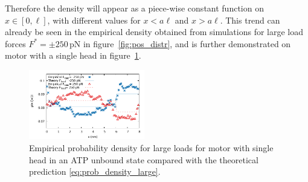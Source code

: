 \documentclass[aps,pre,twocolumn,showpacs,showkeys,superscriptaddress,floatfix]{revtex4-1}
\begin{document}
Therefore the density will appear as a piece-wise constant function on $x \in [0,\ell]$, with different values for $x < a \ell$ and $x > a \ell$. 
This trend can already be seen in the empirical density obtained from simulations for large load forces $F^* = \pm 250 \, \mathrm{pN}$ in figure~\ref{fig:pos_distr},
and is further demonstrated on motor with a single head in figure~\ref{fig:prob_density_large}. 
\begin{figure}[t]
\centering
\includegraphics[width=0.45\textwidth,height=!]{pos_compare.pdf}
\caption{\label{fig:prob_density_large}
Empirical probability density for large loads for motor with single head in an ATP unbound state compared with the theoretical prediction \eqref{eq:prob_density_large}.
}
\end{figure}
\end{document}
